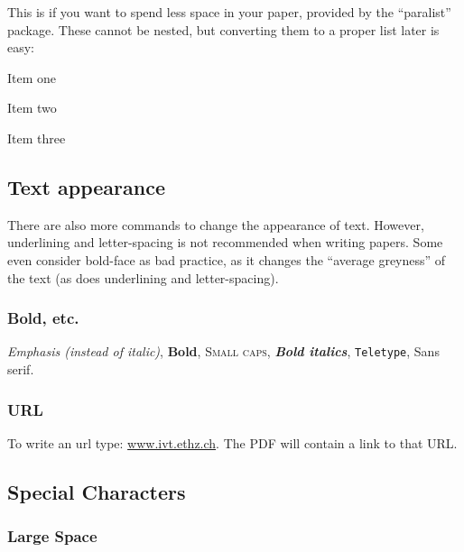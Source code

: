 This is if you want to spend less space in your paper,
provided by the ``paralist'' package.
These cannot be nested,
but converting them to a proper list later is easy:

\begin{inparaenum}[(a)]
  \item Item one
  \item Item two
  \item Item three
\end{inparaenum}

\subsection{Text appearance}

There are also more commands to change the appearance of text.
However, underlining and letter-spacing
is not recommended when writing papers.
Some even consider bold-face as bad practice, as it changes
the ``average greyness'' of the text
(as does underlining and letter-spacing).

\subsubsection{Bold, etc.}

\emph{Emphasis (instead of italic)}, \textbf{Bold},
\textsc{Small caps}, \textbf{\textit{Bold italics}},
\texttt{Teletype}, \textsf{Sans serif}.

\subsubsection{URL}

To write an url type: \url{www.ivt.ethz.ch}.
The PDF will contain a link to that URL.

\subsection{Special Characters}

\subsubsection{Large Space}

